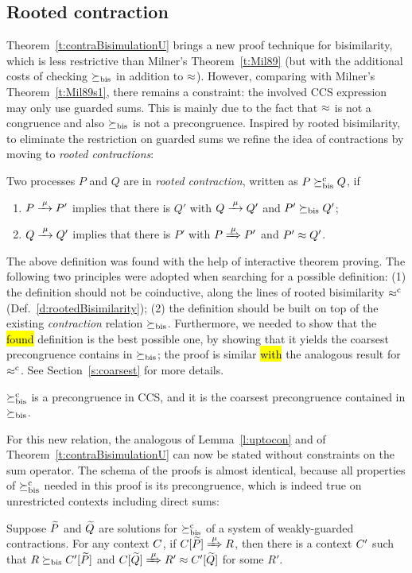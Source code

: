 \subsection{Rooted contraction}
\label{ss:new}

Theorem~\ref{t:contraBisimulationU} brings a new proof technique for
bisimilarity, which is  less restrictive than Milner's
Theorem~\ref{t:Mil89} (but with the additional costs of checking $\mathrel{\succeq_{\rm{bis}}}$
in addition to $\approx$).
However, comparing with Milner's Theorem~\ref{t:Mil89s1}, there remains
a constraint: the involved CCS expression may only
use guarded sums. This is mainly due to the fact that $\approx$ is not a
 congruence and also $\mathrel{\succeq_{\rm{bis}}}$ is not a  precongruence.
Inspired by rooted bisimilarity, to  eliminate the restriction
on guarded sums we refine the idea of contractions by moving
to \emph{rooted contractions}:

\begin{definition}
\label{d:rcontra}
Two processes $P$ and $Q$ are in \emph{rooted contraction}, written as
 $P\mathrel{\succeq^{\rm{c}}_{\rm{bis}}} Q$, if
\begin{enumerate}
\item $P \arr\mu P'$ implies that there is $Q'$ with $Q \arr \mu Q'$
 and $P'\mathrel{\succeq_{\rm{bis}}} Q'$;
\item $Q \arr\mu Q'$   implies that there is $P'$ with $P \Arr \mu
 P'$ and $P' \approx Q'$\enspace.
\end{enumerate}
\end{definition}

The above definition was found with the help of interactive theorem proving.
The following two principles were adopted when searching
for a possible definition: (1) the definition should not be coinductive,
along the lines of rooted bisimilarity $\mathrel{\approx^{\rm{c}}}$ (Def.~\ref{d:rootedBisimilarity});
(2) the definition should be built on top of  the existing \emph{contraction}
relation $\mathrel{\succeq_{\rm{bis}}}$.
Furthermore, we needed to show that the \hl{found} definition is the
best possible one, by showing that it yields the coarsest precongruence
contains in $\mathrel{\succeq_{\rm{bis}}}$; the proof is similar \hl{with}
the analogous result for $\mathrel{\approx^{\rm{c}}}$. See Section~\ref{s:coarsest} for
more details.

\begin{theorem}
\label{t:rcontrPrecongruence}
$\mathrel{\succeq^{\rm{c}}_{\rm{bis}}}$ is a precongruence in CCS, and it is the coarsest
precongruence contained in $\mathrel{\succeq_{\rm{bis}}}$.
\end{theorem}  

For this new relation, the analogous of Lemma~\ref{l:uptocon} and of
Theorem~\ref{t:contraBisimulationU} can now be stated without
constraints on the sum operator.
The schema of the proofs is almost identical, because all 
properties of $\mathrel{\succeq^{\rm{c}}_{\rm{bis}}}$ needed in this proof is its precongruence, which is
indeed true on unrestricted contexts including direct sums:
\begin{lemma}
\label{l:ruptocon}
Suppose $\widetilde P$ and $\widetilde Q$ are solutions  for $\mathrel{\succeq^{\rm{c}}_{\rm{bis}}}$ 
 of a system of weakly-guarded contractions.
For any context $C$, 
if  $\ct{\til P}\Arr{\mu}  R$,
 then there is a context $C'$
such that $R \mathrel{\succeq_{\rm{bis}}} C' [\widetilde P]$ and  $\ct{\til Q} \Arr{\mu} R'
 \wb \ctp{\til Q}$ for some $R'$.
\end{lemma}

